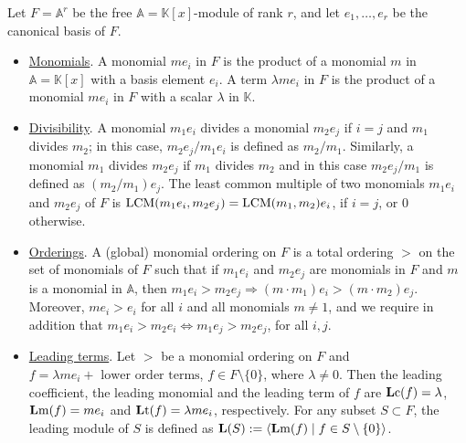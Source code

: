 \documentclass[ALCO]{cedram}
\newcommand{\mbk}{\mbox{$\mathbb{K}$}}
\newcommand{\mba}{\mbox{$\mathbb{A}$}}
\newcommand{\lc}{\mbox{${\bf L}{\rm c}$}}
\newcommand{\lm}{\mbox{${\bf L}{\rm m}$}}
\newcommand{\lmod}{\mbox{${\bf L}$}}
\newcommand{\lt}{\mbox{${\bf L}{\rm t}$}}
\newcommand{\Lcm}{\mbox{${\rm LCM}$}}
\begin{document}
\begin{definitions}\label{firstsetofdefinitions}
Let $F=\mba^r$ be the free $\mba=\mbk[x]$-module of rank $r$, and let
$e_1,\ldots ,e_r$ be the canonical basis of $F$.
\begin{itemize}
\item[$(1)$] \underline{\sc Monomials}. A monomial $me_i$ in $F$ is
  the product of a monomial $m$ in $\mba=\mbk[x]$ with a basis element
  $e_i$. A term $\lambda me_i$ in $F$ is the product of a monomial
  $me_i$ in $F$ with a scalar $\lambda$ in $\mbk$.
\item[$(2)$] \underline{\sc Divisibility}. A monomial $m_1e_i$ divides
  a monomial $m_2e_j$ if $i=j$ and $m_1$ divides $m_2$; in this case,
  $m_2e_j/m_1e_i$ is defined as $m_2/m_1$. Similarly, a monomial $m_1$
  divides $m_2e_j$ if $m_1$ divides $m_2$ and in this case
  $m_2e_j/m_1$ is defined as $(m_2/m_1)e_j$. The least common multiple
  of two monomials $m_1e_i$ and $m_2e_j$ of $F$ is
  $\Lcm(m_1e_i,m_2e_j)=\Lcm(m_1,m_2)e_i$, if $i=j$, or $0$ otherwise.
\item[$(3)$] \underline{\sc Orderings}. A (global) monomial ordering
  on $F$ is a total ordering $>$ on the set of monomials of $F$ such
  that if $m_1e_i$ and $m_2e_j$ are monomials in $F$ and $m$ is a
  monomial in $\mba$, then $m_1e_i> m_2e_j\Rightarrow (m\cdot m_1)e_i>
  (m\cdot m_2)e_j$. Moreover, $me_i>e_i$ for all $i$ and all monomials
  $m\neq 1$, and we require in addition that
  $m_1e_i>m_2e_i\Leftrightarrow m_1e_j>m_2e_j$, for all $i,j$.
\item[$(4)$] \underline{\sc Leading terms}. Let $>$ be a monomial
  ordering on $F$ and $f=\lambda me_i+\mbox{ lower order terms}$,
  $f\in F\setminus\{0\}$, where $\lambda\neq 0$. Then the leading
  coefficient, the leading monomial and the leading term of $f$ are
  $\lc(f)=\lambda$, $\lm(f)=me_i$ and $\lt(f)=\lambda me_i$,
  respectively. For any subset $S\subset F$, the leading module of $S$
  is defined as $\lmod(S):=\langle\lm(f)\mid f\in
  S\setminus\{0\}\rangle$.
\end{itemize}
\end{definitions}
\end{document}
